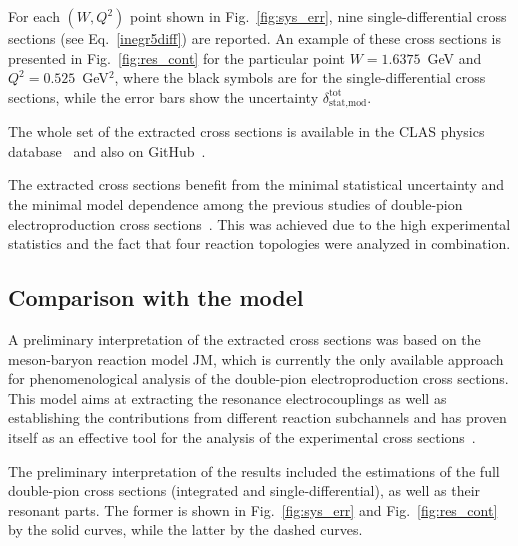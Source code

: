 \documentclass[prc,twocolumn,superscriptaddress,showpacs,amssymb,amsmath,amsfonts,aps,nofootinbib]{revtex4-1}
\begin{document}
For each $(W,Q^{2})$ point shown in Fig.~\ref{fig:sys_err},
nine single-differential cross sections (see Eq.~\eqref{inegr5diff}) are  reported. An example of these cross sections is presented in Fig.~\ref{fig:res_cont} for the particular point  $W = 1.6375$~GeV and $Q^{2} = 0.525$~GeV$^{2}$, where the black symbols are for the single-differential cross sections, while the error  bars show the uncertainty $\delta^{\text{tot}}_{\text{stat,mod}}$. 

The whole set of the extracted cross sections is available in the CLAS physics database~\cite{CLAS_DB} and also on GitHub~\cite{Github:data}.


The extracted cross sections benefit from the minimal statistical uncertainty and the minimal model dependence among the previous studies of double-pion electroproduction cross sections~\cite{Fedotov:2008aa,Isupov:2017lnd,Ripani:2002ss}. This was achieved due to the high experimental statistics and the fact that four reaction topologies were analyzed in combination. 





\subsection{Comparison with the model }




A preliminary interpretation of the extracted cross sections was based on the meson-baryon reaction model JM, which is currently the only available approach for phenomenological analysis of the double-pion electroproduction cross sections. This model aims at extracting the resonance electrocouplings as well as
establishing the contributions from different reaction subchannels and has proven itself as an effective tool for the analysis of the experimental cross sections~\cite{Mokeev:2008iw,Mokeev:2012vsa,Mokeev:2015lda}.

The preliminary interpretation of the results included the estimations of the full double-pion cross sections (integrated and single-differential),  as well as their resonant parts. The former is shown in Fig.~\ref{fig:sys_err} and Fig.~\ref{fig:res_cont} by the solid curves, while the latter by the dashed curves.
\end{document}
